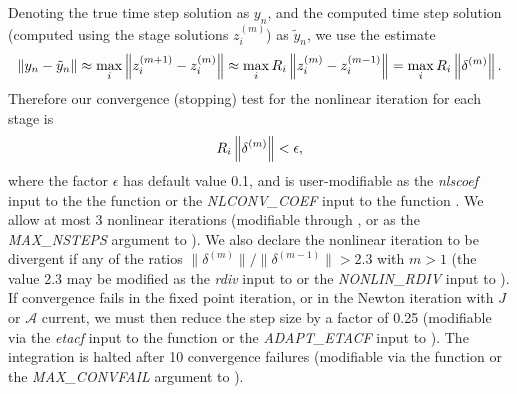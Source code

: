\documentclass[letterpaper,10pt,english]{sphinxmanual}
\begin{document}
Denoting the true time step solution as \(y_n\), and the computed
time step solution (computed using the stage solutions
\(z_i^{(m)}\)) as \(\tilde{y}_n\), we use the estimate
\begin{gather}
\begin{split}\left\| y_n - \tilde{y}_n \right\| \approx
\max_i \left\| z_i^{(m+1)} - z_i^{(m)} \right\| \approx
\max_i R_i \left\| z_i^{(m)} - z_i^{(m-1)} \right\| =
\max_i R_i \left\| \delta^{(m)} \right\|.\end{split}\notag
\end{gather}
Therefore our convergence (stopping) test for the nonlinear iteration
for each stage is
\begin{gather}
\begin{split}R_i \left\|\delta^{(m)} \right\| < \epsilon,\end{split}\notag
\end{gather}
where the factor \(\epsilon\) has default value 0.1, and is
user-modifiable as the \emph{nlscoef} input to the the function
{\hyperref[c_interface/User_callable:c.ARKodeSetNonlinConvCoef]{\emph{}}} or the \emph{NLCONV\_COEF} input to the
function {\hyperref[f_interface/Usage:f/_/FARKSETRIN]{\emph{}}}.  We allow at most 3 nonlinear
iterations (modifiable through {\hyperref[c_interface/User_callable:c.ARKodeSetMaxNonlinIters]{\emph{}}}, or
as the \emph{MAX\_NSTEPS} argument to {\hyperref[f_interface/Usage:f/_/FARKSETIIN]{\emph{}}}).  We also
declare the nonlinear iteration to be divergent if any of the ratios
\(\|\delta^{(m)}\| / \|\delta^{(m-1)}\| > 2.3\) with \(m>1\)
(the value 2.3 may be modified as the \emph{rdiv} input to
{\hyperref[c_interface/User_callable:c.ARKodeSetNonlinRDiv]{\emph{}}} or the \emph{NONLIN\_RDIV} input to
{\hyperref[f_interface/Usage:f/_/FARKSETRIN]{\emph{}}}).  If convergence fails in the fixed
point iteration, or in the Newton iteration with \(J\) or
\({\mathcal A}\) current, we must then reduce the step size by a
factor of 0.25 (modifiable via the \emph{etacf} input to the
{\hyperref[c_interface/User_callable:c.ARKodeSetMaxCFailGrowth]{\emph{}}} function or the \emph{ADAPT\_ETACF}
input to {\hyperref[f_interface/Usage:f/_/FARKSETRIN]{\emph{}}}).  The integration is halted after 10
convergence failures (modifiable via the
{\hyperref[c_interface/User_callable:c.ARKodeSetMaxConvFails]{\emph{}}} function or the \emph{MAX\_CONVFAIL}
argument to {\hyperref[f_interface/Usage:f/_/FARKSETIIN]{\emph{}}}).
\end{document}
